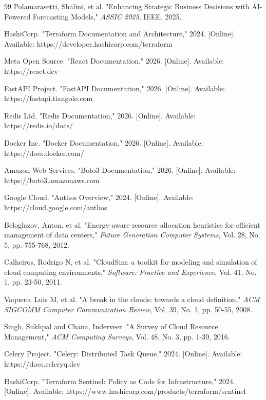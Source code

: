 \begin{thebibliography}{99}
     Polamarasetti, Shalini, et al. "Enhancing Strategic Business Decisions with AI-Powered Forecasting Models," \textit{ASSIC 2025}, IEEE, 2025.

     HashiCorp. "Terraform Documentation and Architecture," 2024. [Online]. Available: https://developer.hashicorp.com/terraform

     Meta Open Source. "React Documentation," 2026. [Online]. Available: https://react.dev

     FastAPI Project. "FastAPI Documentation," 2026. [Online]. Available: https://fastapi.tiangolo.com

     Redis Ltd. "Redis Documentation," 2026. [Online]. Available: https://redis.io/docs/

     Docker Inc. "Docker Documentation," 2026. [Online]. Available: https://docs.docker.com/

     Amazon Web Services. "Boto3 Documentation," 2026. [Online]. Available: https://boto3.amazonaws.com

     Google Cloud. "Anthos Overview," 2024. [Online]. Available: https://cloud.google.com/anthos

     Beloglazov, Anton, et al. "Energy-aware resource allocation heuristics for efficient management of data centers," \textit{Future Generation Computer Systems}, Vol. 28, No. 5, pp. 755-768, 2012.

     Calheiros, Rodrigo N, et al. "CloudSim: a toolkit for modeling and simulation of cloud computing environments," \textit{Software: Practice and Experience}, Vol. 41, No. 1, pp. 23-50, 2011.

     Vaquero, Luis M, et al. "A break in the clouds: towards a cloud definition," \textit{ACM SIGCOMM Computer Communication Review}, Vol. 39, No. 1, pp. 50-55, 2008.

     Singh, Sukhpal and Chana, Inderveer. "A Survey of Cloud Resource Management," \textit{ACM Computing Surveys}, Vol. 48, No. 3, pp. 1-39, 2016.

     Celery Project. "Celery: Distributed Task Queue," 2024. [Online]. Available: https://docs.celeryq.dev

     HashiCorp. "Terraform Sentinel: Policy as Code for Infrastructure," 2024. [Online]. Available: https://www.hashicorp.com/products/terraform/sentinel


\end{thebibliography}
